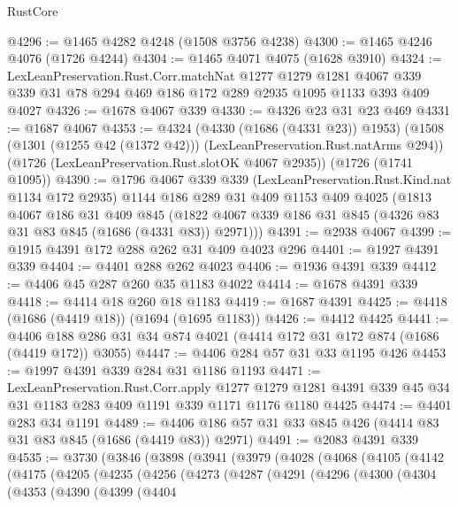 \begin{lexlean}{RustCore}
\begin{coremodule}
@4296 := @1465 @4282 @4248 (@1508 @3756 @4238)
@4300 := @1465 @4246 @4076 (@1726 @4244)
@4304 := @1465 @4071 @4075 (@1628 @3910)
@4324 := LexLeanPreservation.Rust.Corr.matchNat
    @1277
    @1279
    @1281
    @4067
    @339
    @339
    @31
    @78
    @294
    @469
    @186
    @172
    @289
    @2935
    @1095
    @1133
    @393
    @409
    @4027
@4326 := @1678 @4067 @339
@4330 := @4326 @23 @31 @23 @469
@4331 := @1687 @4067
@4353 := @4324
    (@4330 (@1686 (@4331 @23)) @1953)
    (@1508 (@1301 (@1255 @42 (@1372 @42))) (LexLeanPreservation.Rust.natArms @294))
    (@1726 (LexLeanPreservation.Rust.slotOK @4067 @2935))
    (@1726 (@1741 @1095))
@4390 := @1796
    @4067
    @339
    @339
    (LexLeanPreservation.Rust.Kind.nat @1134 @172 @2935)
    @1144
    @186
    @289
    @31
    @409
    @1153
    @409
    @4025
    (@1813
      @4067
      @186
      @31
      @409
      @845
      (@1822 @4067 @339 @186 @31 @845 (@4326 @83 @31 @83 @845 (@1686 (@4331 @83)) @2971)))
@4391 := @2938 @4067
@4399 := @1915 @4391 @172 @288 @262 @31 @409 @4023 @296
@4401 := @1927 @4391 @339
@4404 := @4401 @288 @262 @4023
@4406 := @1936 @4391 @339
@4412 := @4406 @45 @287 @260 @35 @1183 @4022
@4414 := @1678 @4391 @339
@4418 := @4414 @18 @260 @18 @1183
@4419 := @1687 @4391
@4425 := @4418 (@1686 (@4419 @18)) (@1694 (@1695 @1183))
@4426 := @4412 @4425
@4441 := @4406 @188 @286 @31 @34 @874 @4021 (@4414 @172 @31 @172 @874 (@1686 (@4419 @172)) @3055)
@4447 := @4406 @284 @57 @31 @33 @1195 @426
@4453 := @1997 @4391 @339 @284 @31 @1186 @1193
@4471 := LexLeanPreservation.Rust.Corr.apply
    @1277
    @1279
    @1281
    @4391
    @339
    @45
    @34
    @31
    @1183
    @283
    @409
    @1191
    @339
    @1171
    @1176
    @1180
    @4425
@4474 := @4401 @283 @34 @1191
@4489 := @4406 @186 @57 @31 @33 @845 @426 (@4414 @83 @31 @83 @845 (@1686 (@4419 @83)) @2971)
@4491 := @2083 @4391 @339
@4535 := @3730
    (@3846
      (@3898
        (@3941
          (@3979
            (@4028
              (@4068
                (@4105
                  (@4142
                    (@4175
                      (@4205
                        (@4235
                          (@4256
                            (@4273
                              (@4287
                                (@4291
                                  (@4296
                                    (@4300
                                      (@4304
                                        (@4353
                                          (@4390
                                            (@4399
                                              (@4404

\end{coremodule}
\end{lexlean}
